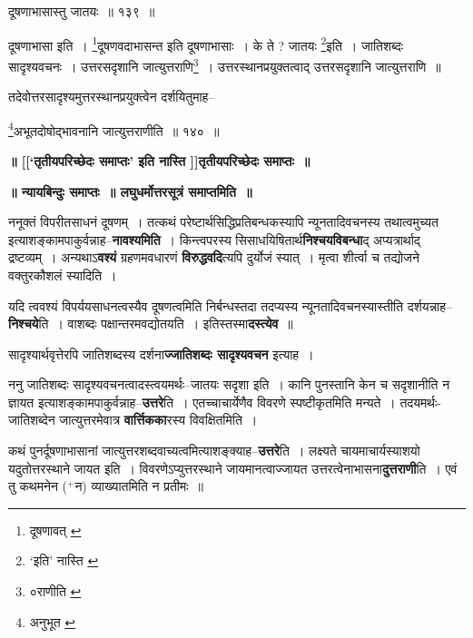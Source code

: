\documentclass[article,12pt,a4paper]{memoir}
\newcommand{\add}[1]{($^{+}$#1)}
\begin{document}
	  \pstart दूषणाभासास्तु जातयः ॥ १३९ ॥
	\pend
       

	  \pstart दूषणाभासा इति । \footnote{दूषणावत् \cite{dp-msB}}दूषणवदाभासन्त इति दूषणाभासाः । के ते ? जातयः \footnote{‘इति’ नास्ति \cite{dp-msA} \cite{dp-msB} \cite{dp-edP} \cite{dp-edH} \cite{dp-edE} \cite{dp-edN}}इति । जातिशब्दः सादृश्यवचनः । उत्तरसदृशानि जात्युत्तराणि\footnote{०राणीति \cite{dp-msA} \cite{dp-edP} \cite{dp-edH} \cite{dp-edE}} । उत्तरस्थानप्रयुक्तत्वाद् उत्तरसदृशानि जात्युत्तराणि ॥
	\pend
       

	  \pstart तदेवोत्तरसादृश्यमुत्तरस्थानप्रयुक्त्वेन दर्शयितुमाह--
	\pend
       

	  \pstart \footnote{अनुभूत \cite{dp-msB} \cite{dp-edP} \cite{dp-edH}}अभूतदोषोद्भावनानि जात्युत्तराणीति ॥ १४० ॥
	\pend
       

	  \begin{center}%
	\textbf{॥ [[‘तृतीयपरिच्छेदः समाप्तः’ इति नास्ति \cite{dp-msC} \cite{dp-msD}]]तृतीयपरिच्छेदः समाप्तः ॥}
	\end{center}
	 

	  \begin{center}%
	\textbf{॥ न्यायबिन्दुः समाप्तः ॥ लघुधर्मोत्तरसूत्रं समाप्तमिति ॥}
	\end{center}
	

	  \pstart ननूक्तं विपरीतसाधनं दूषणम् । तत्कथं परेष्टार्थसिद्धिप्रतिबन्धकस्यापि न्यूनतादिवचनस्य तथात्वमुच्यत इत्याशङ्कामपाकुर्वन्नाह--\textbf{नावश्यमिति} । किन्त्वपरस्य सिसाधयिषितार्थ\textbf{निश्चयविबन्धा}द् अप्यत्रार्थाद् द्रष्टव्यम् । अन्यथाऽ\textbf{वश्यं} ग्रहणमवधारणं \textbf{विरुद्धवदि}त्यपि दुर्योजं स्यात् । मृत्वा शीर्त्वा च तद्योजने वक्तुरकौशलं स्यादिति ।
	\pend
      

	  \pstart यदि त्ववश्यं विपर्ययसाधनत्वस्यैव दूषणत्वमिति निर्बन्धस्तदा तदप्यस्य न्यूनतादिवचनस्यास्तीति दर्शयन्नाह--\textbf{निश्चये}ति । वाशब्दः पक्षान्तरमवद्योतयति । इतिस्तस्मा\textbf{दस्त्येव} ॥
	\pend
      

	  \pstart सादृश्यार्थवृत्तेरपि जातिशब्दस्य दर्शना\textbf{ज्जातिशब्दः सादृश्यवचन} इत्याह ।
	\pend
      

	  \pstart ननु जातिशब्दः सादृश्यवचनत्वादस्त्वयमर्थः--जातयः सदृशा इति । कानि पुनस्तानि केन च सदृशानीति न ज्ञायत इत्याशङ्कामपाकुर्वन्नाह--\textbf{उत्तरे}ति । एतच्चाचार्येणैव विवरणे स्पष्टीकृतमिति मन्यते । तदयमर्थः-जातिशब्देन जात्युत्तरमेवात्र \textbf{वार्त्तिकका}रस्य विवक्षितमिति ।
	\pend
      

	  \pstart कथं पुनर्दूषणाभासानां जात्युत्तरशब्दवाच्यत्वमित्याशङ्क्याह--\textbf{उत्तरे}ति । लक्ष्यते चायमाचार्यस्याशयो यदुतोत्तरस्थाने जायत इति । विवरणेऽप्युत्तरस्थाने जायमानत्वाज्जायत उत्तरत्वेनाभासना\textbf{दुत्तराणी}ति । एवं तु कथमनेन \add{न} व्याख्यातमिति न प्रतीमः ॥
	\pend
      
\end{document}
